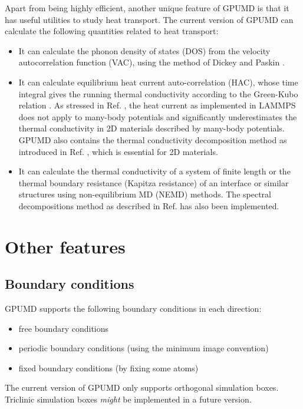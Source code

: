 \documentclass[12pt,a4paper]{report}
\begin{document}
Apart from being highly efficient, another unique feature of GPUMD is that it has useful utilities to study heat transport. The current version of GPUMD can calculate the following quantities related to heat transport:
\begin{itemize}
\item It can calculate the phonon density of states (DOS) from the velocity autocorrelation function (VAC), using the method of Dickey and Paskin \cite{dickey1969pr}.
\item It can calculate equilibrium heat current auto-correlation (HAC), whose time integral gives the running thermal conductivity according to the Green-Kubo relation \cite{green1954jcp,kubo1957jpsj}. As stressed in Ref. \cite{fan2015prb}, the heat current as implemented in LAMMPS \cite{plimpton1995jcp} does not apply to many-body potentials and significantly underestimates the thermal conductivity in 2D materials described by many-body potentials. GPUMD also contains the thermal conductivity decomposition method as introduced in Ref. \cite{fan2017prb}, which is essential for 2D materials.
\item It can calculate the thermal conductivity of a system of finite length or the thermal boundary resistance (Kapitza resistance) of an interface or similar structures using non-equilibrium MD (NEMD) methods. The spectral decompositions method as described in Ref. \cite{fan2017prb} has also been implemented.
\end{itemize}



\section{Other features}

\subsection{Boundary conditions}

GPUMD supports the following boundary conditions in each direction:
  \begin{itemize}
  \item free boundary conditions
  \item periodic boundary conditions (using the minimum image convention)
  \item fixed boundary conditions (by fixing some atoms)
  \end{itemize}

The current version of GPUMD only supports orthogonal simulation boxes. Triclinic simulation boxes \textit{might} be implemented in a future version.
\end{document}
